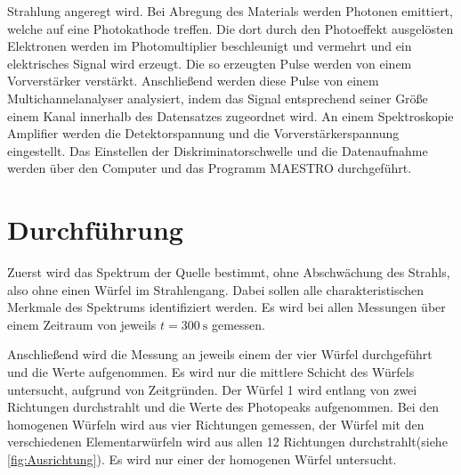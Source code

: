 Strahlung angeregt wird. Bei Abregung des Materials werden Photonen emittiert, welche auf eine Photokathode treffen. Die dort durch den Photoeffekt
ausgelösten Elektronen werden im Photomultiplier beschleunigt und vermehrt und ein elektrisches Signal wird erzeugt.
Die so erzeugten Pulse werden von einem Vorverstärker verstärkt.
Anschließend werden diese Pulse von einem Multichannelanalyser analysiert, indem das Signal entsprechend seiner Größe einem Kanal innerhalb des Datensatzes zugeordnet wird.
An einem Spektroskopie Amplifier werden die Detektorspannung und die Vorverstärkerspannung eingestellt. Das Einstellen der Diskriminatorschwelle und die Datenaufnahme
werden über den Computer und das Programm MAESTRO durchgeführt.



\section{Durchführung}
\label{sec:Durchführung}
Zuerst wird das Spektrum der Quelle bestimmt, ohne Abschwächung des Strahls, also ohne einen Würfel im Strahlengang.
Dabei sollen alle charakteristischen Merkmale des Spektrums identifiziert werden.
Es wird bei allen Messungen über einem Zeitraum von jeweils $t = \qty{300}{\second}$ gemessen.

Anschließend wird die Messung an jeweils einem der vier Würfel durchgeführt und die Werte aufgenommen.
Es wird nur die mittlere Schicht des Würfels untersucht, aufgrund von Zeitgründen.
Der Würfel 1 wird entlang von zwei Richtungen durchstrahlt und die Werte des Photopeaks aufgenommen.
Bei den homogenen Würfeln wird aus vier Richtungen gemessen, der Würfel mit den verschiedenen 
Elementarwürfeln wird aus allen 12 Richtungen durchstrahlt(siehe \autoref{fig:Ausrichtung}).
Es wird nur einer der homogenen Würfel untersucht.


